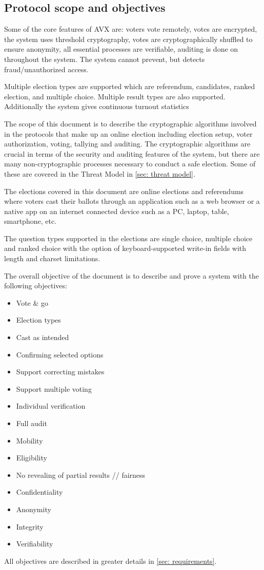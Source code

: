 \subsection{Protocol scope and objectives}
Some of the core features of AVX are: voters vote remotely, votes are encrypted, the system uses threshold cryptography, votes are cryptographically shuffled to ensure anonymity, all essential processes are verifiable, auditing is done on throughout the system. The system cannot prevent, but detects fraud/unauthorized access.

Multiple election types are supported which are referendum, candidates, ranked election, and multiple choice. Multiple result types are also supported. Additionally the system gives continuous turnout statistics

The scope of this document is to describe the cryptographic algorithms involved in the protocols that make up an online election including election setup, voter authorization, voting, tallying and auditing. The cryptographic algorithms are crucial in terms of the security and auditing features of the system, but there are many non-cryptographic processes necessary to conduct a safe election. Some of these are covered in the Threat Model in \cref{sec: threat model}.

The elections covered in this document are online elections and referendums where voters cast their ballots through an application such as a web browser or a native app on an internet connected device such as a PC, laptop, table, smartphone, etc.

The question types supported in the elections are single choice, multiple choice and ranked choice with the option of keyboard-supported write-in fields with length and charset limitations.

The overall objective of the document is to describe and prove a system with the following objectives:

\begin{itemize}
    \item Vote \& go
    \item Election types
    \item Cast as intended
    \item Confirming selected options
    \item Support correcting mistakes
    \item Support multiple voting
    \item Individual verification
    \item Full audit

    \item Mobility

    \item Eligibility
    \item No revealing of partial results // fairness
    \item Confidentiality
    \item Anonymity
    \item Integrity
    \item Verifiability
\end{itemize}

All objectives are described in greater details in \cref{sec: requirements}.
